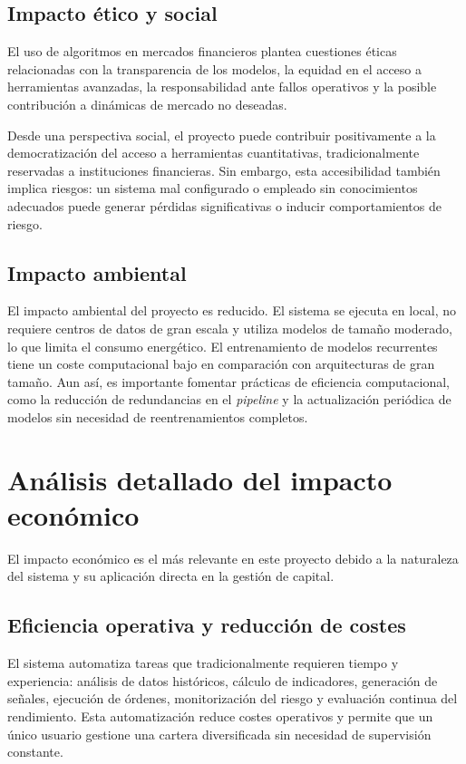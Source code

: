 \subsection{Impacto ético y social}

El uso de algoritmos en mercados financieros plantea cuestiones éticas relacionadas con la transparencia de los modelos, la equidad en el acceso a
herramientas avanzadas, la responsabilidad ante fallos operativos y la posible contribución a dinámicas de mercado no deseadas.

Desde una perspectiva social, el proyecto puede contribuir positivamente a la democratización del acceso a herramientas cuantitativas,
tradicionalmente reservadas a instituciones financieras. Sin embargo, esta accesibilidad también implica riesgos: un sistema mal configurado o
empleado sin conocimientos adecuados puede generar pérdidas significativas o inducir comportamientos de riesgo.

\subsection{Impacto ambiental}

El impacto ambiental del proyecto es reducido. El sistema se ejecuta en local, no requiere centros de datos de gran escala y utiliza modelos de tamaño
moderado, lo que limita el consumo energético. El entrenamiento de modelos recurrentes tiene un coste computacional bajo en comparación con
arquitecturas de gran tamaño. Aun así, es importante fomentar prácticas de eficiencia computacional, como la reducción de redundancias en el
\textit{pipeline} y la actualización periódica de modelos sin necesidad de reentrenamientos completos.

\section{Análisis detallado del impacto económico}

El impacto económico es el más relevante en este proyecto debido a la naturaleza del sistema y su aplicación directa en la gestión de capital.

\subsection{Eficiencia operativa y reducción de costes}

El sistema automatiza tareas que tradicionalmente requieren tiempo y experiencia: análisis de datos históricos, cálculo de indicadores, generación de
señales, ejecución de órdenes, monitorización del riesgo y evaluación continua del rendimiento. Esta automatización reduce costes operativos y
permite que un único usuario gestione una cartera diversificada sin necesidad de supervisión constante.

